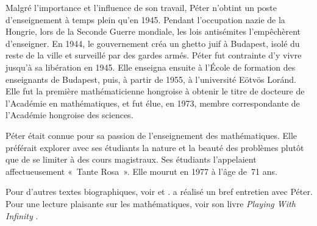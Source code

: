 \documentclass[../../../include/open-logic-section]{subfiles}
\begin{document}
Malgré l'importance
et l'influence
de son travail,
P\'eter n'obtint
un poste d'enseignement
à temps plein
qu'en 1945.
Pendant l'occupation
nazie de la
Hongrie, lors
de la Seconde
Guerre mondiale,
les lois antisémites
l'empêchèrent
d'enseigner.
En 1944,
le gouvernement
créa un ghetto
juif à Budapest,
isolé du reste
de la ville
et surveillé
par des gardes
armés. P\'eter
fut contrainte
d'y vivre
jusqu'à sa
libération
en 1945.
Elle enseigna
ensuite à
l'École de
formation des
enseignants
de Budapest,
puis, à partir
de 1955,
à l'université
E\"otv\"os Lor\'and.
Elle fut la
première mathématicienne
hongroise à
obtenir le
titre de
docteure de
l'Académie en
mathématiques,
et fut élue,
en 1973,
membre correspondante
de l'Académie hongroise
des sciences.

P\'eter était
connue pour
sa passion
de l'enseignement
des mathématiques.
Elle préférait
explorer avec
ses étudiants
la nature
et la beauté
des problèmes
plutôt que
de se limiter
à des cours
magistraux.
Ses étudiants
l'appelaient
affectueusement
«~Tante Rosa~».
Elle mourut
en 1977
à l'âge
de~71 ans.

\begin{reading}
Pour d'autres
textes biographiques,
voir
\citep{Oconnor2014}
et
\citep{Andrasfai1986}.
\citet{Tamassy1994}
a réalisé
un bref entretien
avec P\'eter.
Pour une lecture
plaisante sur
les mathématiques,
voir son livre
\emph{Playing
With Infinity}
\citep{Peter2010}.
\end{reading}
\end{document}
